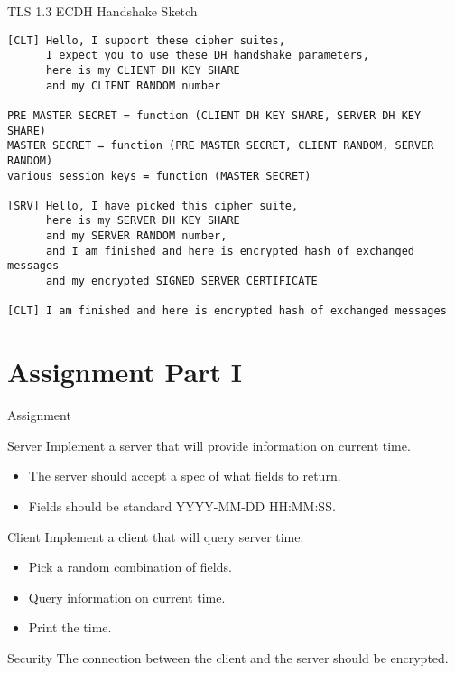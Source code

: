 \begin{frame}[fragile]{TLS 1.3 ECDH Handshake Sketch}
\begin{lstlisting}[style=mini]
[CLT] Hello, I support these cipher suites,
      I expect you to use these DH handshake parameters,
      here is my CLIENT DH KEY SHARE
      and my CLIENT RANDOM number

PRE MASTER SECRET = function (CLIENT DH KEY SHARE, SERVER DH KEY SHARE)
MASTER SECRET = function (PRE MASTER SECRET, CLIENT RANDOM, SERVER RANDOM)
various session keys = function (MASTER SECRET)

[SRV] Hello, I have picked this cipher suite,
      here is my SERVER DH KEY SHARE
      and my SERVER RANDOM number,
      and I am finished and here is encrypted hash of exchanged messages
      and my encrypted SIGNED SERVER CERTIFICATE

[CLT] I am finished and here is encrypted hash of exchanged messages
\end{lstlisting}
\end{frame}


\section{Assignment Part I}


\begin{frame}{Assignment}
    \begin{block}{Server}
        Implement a server that will provide information on current time.
        \begin{itemize}
            \item The server should accept a spec of what fields to return.
            \item Fields should be standard YYYY-MM-DD HH:MM:SS.
        \end{itemize}
    \end{block}

    \begin{block}{Client}
        Implement a client that will query server time:
        \begin{itemize}
            \item Pick a random combination of fields.
            \item Query information on current time.
            \item Print the time.
        \end{itemize}
    \end{block}

    \begin{block}{Security}
        The connection between the client and the server should be encrypted.
    \end{block}
\end{frame}


